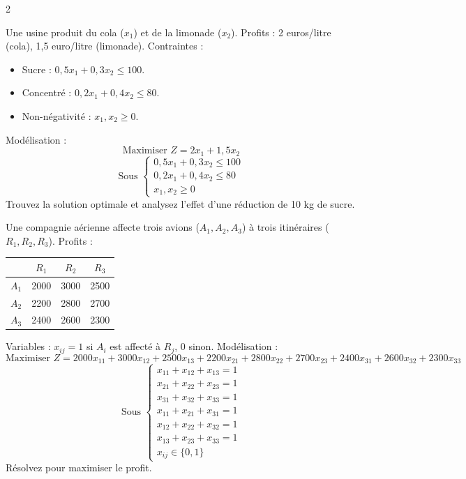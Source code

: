 \begin{multicols}{2}
\begin{exercice}
	Une usine produit du cola (\(x_1\)) et de la limonade (\(x_2\)). Profits : 2 euros/litre (cola), 1,5 euro/litre (limonade). Contraintes :
	\begin{itemize}
		\item Sucre : \(0,5x_1 + 0,3x_2 \leq 100\).
		\item Concentré : \(0,2x_1 + 0,4x_2 \leq 80\).
		\item Non-négativité : \(x_1, x_2 \geq 0\).
	\end{itemize}
	Modélisation :
	\[
	\text{Maximiser } Z = 2x_1 + 1,5x_2
	\]
	\[
	\text{Sous } \begin{cases}
	0,5x_1 + 0,3x_2 \leq 100 \\
	0,2x_1 + 0,4x_2 \leq 80 \\
	x_1, x_2 \geq 0
	\end{cases}
	\]
	Trouvez la solution optimale et analysez l'effet d'une réduction de 10 kg de sucre.
\end{exercice}

\begin{exercice}
	Une compagnie aérienne affecte trois avions (\(A_1, A_2, A_3\)) à trois itinéraires (\(R_1, R_2, R_3\)). Profits :
	\begin{center}
		\begin{tabular}{c|ccc}
			& \(R_1\) & \(R_2\) & \(R_3\) \\
			\hline
			\(A_1\) & 2000 & 3000 & 2500 \\
			\(A_2\) & 2200 & 2800 & 2700 \\
			\(A_3\) & 2400 & 2600 & 2300 \\
		\end{tabular}
	\end{center}
	Variables : \(x_{ij} = 1\) si \(A_i\) est affecté à \(R_j\), 0 sinon.
	Modélisation :
	\[
	\text{Maximiser } Z = 2000x_{11} + 3000x_{12} + 2500x_{13} + 2200x_{21} + 2800x_{22} + 2700x_{23} + 2400x_{31} + 2600x_{32} + 2300x_{33}
	\]
	\[
	\text{Sous } \begin{cases}
	x_{11} + x_{12} + x_{13} = 1 \\
	x_{21} + x_{22} + x_{23} = 1 \\
	x_{31} + x_{32} + x_{33} = 1 \\
	x_{11} + x_{21} + x_{31} = 1 \\
	x_{12} + x_{22} + x_{32} = 1 \\
	x_{13} + x_{23} + x_{33} = 1 \\
	x_{ij} \in \{0,1\}
	\end{cases}
	\]
	Résolvez pour maximiser le profit.
\end{exercice}


\end{multicols}
